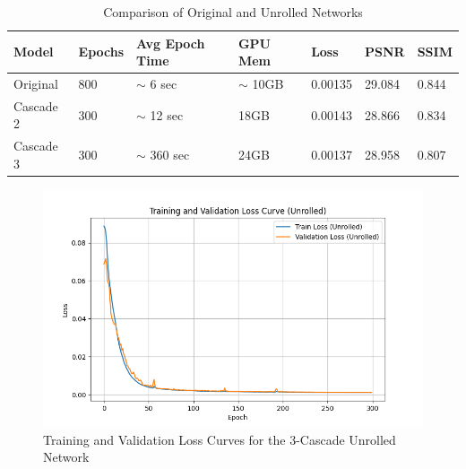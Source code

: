 \documentclass{article}
\begin{document}
\begin{table}[H]
  \caption{Comparison of Original and Unrolled Networks}
  \label{tab:unrolled_compare}
  \centering
  \begin{tabular}{lllllll}
    \toprule
    Model     & Epochs & Avg Epoch Time & GPU Mem     & Loss    & PSNR   & SSIM  \\
    \midrule
    Original  & 800    & $\sim$ 6 sec   & $\sim$ 10GB & 0.00135 & 29.084 & 0.844 \\
    Cascade 2 & 300    & $\sim$ 12 sec  & 18GB        & 0.00143 & 28.866 & 0.834 \\
    Cascade 3 & 300    & $\sim$ 360 sec & 24GB        & 0.00137 & 28.958 & 0.807 \\
    \bottomrule
  \end{tabular}
\end{table}

\begin{figure}[ht]
  \centering
  \includegraphics[width=\linewidth]{../assets/Training Loss and Validation Loss Unrolled.png}
  \caption{Training and Validation Loss Curves for the 3-Cascade Unrolled Network}
  \label{fig:loss_unrolled}
\end{figure}
\end{document}
